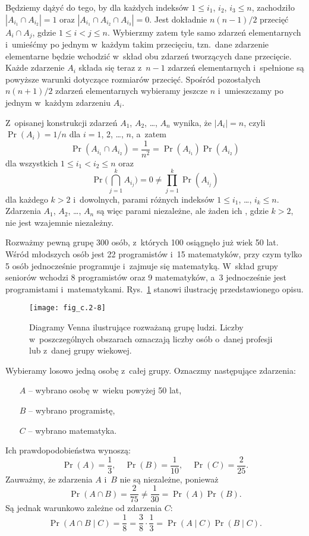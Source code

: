 Będziemy dążyć do tego, by dla każdych indeksów $1\le i_1$, $i_2$, $i_3\le n$, zachodziło $|A_{i_1}\cap A_{i_2}|=1$ oraz $|A_{i_1}\cap A_{i_2}\cap A_{i_3}|=0$.
Jest dokładnie $n(n-1)/2$ przecięć $A_i\cap A_j$, gdzie $1\le i<j\le n$.
Wybierzmy zatem tyle samo zdarzeń elementarnych i~umieśćmy po jednym w~każdym takim przecięciu, tzn.\ dane zdarzenie elementarne będzie wchodzić w~skład obu zdarzeń tworzących dane przecięcie.
Każde zdarzenie $A_i$ składa się teraz z~$n-1$ zdarzeń elementarnych i~spełnione są powyższe warunki dotyczące rozmiarów przecięć.
Spośród pozostałych $n(n+1)/2$ zdarzeń elementarnych wybieramy jeszcze $n$ i~umieszczamy po jednym w~każdym zdarzeniu $A_i$.

Z~opisanej konstrukcji zdarzeń $A_1$, $A_2$, \dots, $A_n$ wynika, że $|A_i|=n$, czyli $\Pr(A_i)=1/n$ dla $i=1$, 2, \dots, $n$, a~zatem
\[
	\Pr(A_{i_1}\cap A_{i_2}) = \frac{1}{n^2} = \Pr(A_{i_1})\Pr(A_{i_2})
\]
dla wszystkich $1\le i_1<i_2\le n$ oraz
\[
	\Pr\biggl(\bigcap_{j=1}^kA_{i_j}\biggr) = 0 \ne \prod_{j=1}^k\Pr(A_{i_j})
\]
dla każdego $k>2$ i~dowolnych, parami różnych indeksów $1\le i_1$, \dots, $i_k\le n$.
Zdarzenia $A_1$, $A_2$, \dots, $A_n$ są więc parami niezależne, ale żaden ich , gdzie $k>2$, nie jest wzajemnie niezależny.

\exercise %
Rozważmy pewną grupę 300 osób, z~których 100 osiągnęło już wiek 50 lat.
Wśród młodszych osób jest 22 programistów i~15 matematyków, przy czym tylko 5 osób jednocześnie programuje i~zajmuje się matematyką.
W~skład grupy seniorów wchodzi 8 programistów oraz 9 matematyków, a~3 jednocześnie jest programistami i~matematykami.
Rys.\ \ref{fig:C.2-8} stanowi ilustrację przedstawionego opisu.
\begin{figure}[ht]
	\begin{center}
		\texttt{[image: fig\_c.2-8]}
	\end{center}
	\caption{Diagramy Venna ilustrujące rozważaną grupę ludzi.
Liczby w~poszczególnych obszarach oznaczają liczby osób o~danej profesji lub z~danej grupy wiekowej.} \label{fig:C.2-8}
\end{figure}

Wybieramy losowo jedną osobę z~całej grupy.
Oznaczmy następujące zdarzenia:
\begin{itemize}
	\item[$A$] -- wybrano osobę w~wieku powyżej 50 lat,
	\item[$B$] -- wybrano programistę,
	\item[$C$] -- wybrano matematyka.
\end{itemize}
Ich prawdopodobieństwa wynoszą:
\[
	\Pr(A) = \frac{1}{3}, \quad \Pr(B) = \frac{1}{10}, \quad \Pr(C) = \frac{2}{25}.
\]
Zauważmy, że zdarzenia $A$ i~$B$ nie są niezależne, ponieważ
\[
	\Pr(A\cap B) = \frac{2}{75} \ne \frac{1}{30} = \Pr(A)\Pr(B).
\]
Są jednak warunkowo zależne od zdarzenia $C$:
\[
	\Pr(A\cap B\mid C) = \frac{1}{8} = \frac{3}{8}\cdot\frac{1}{3} = \Pr(A\mid C)\Pr(B\mid C).
\]

